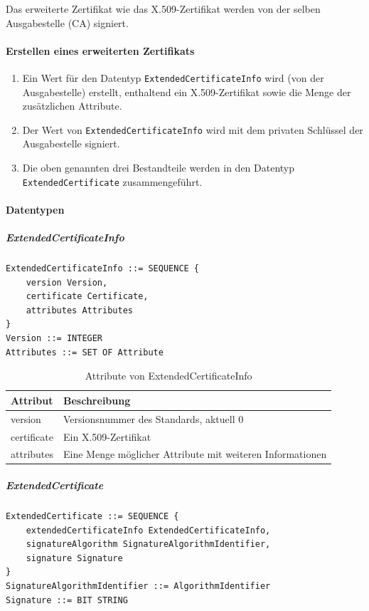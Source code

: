 \documentclass[10pt,a4paper]{article}
\begin{document}
Das erweiterte Zertifikat wie das X.509-Zertifikat werden von der selben Ausgabestelle
(CA) signiert.

\paragraph{Erstellen eines erweiterten Zertifikats}
\begin{enumerate}
    \item Ein Wert für den Datentyp \texttt{ExtendedCertificateInfo} wird (von der
        Ausgabestelle) erstellt, enthaltend ein X.509-Zertifikat sowie die Menge der
        zusätzlichen Attribute.
    \item Der Wert von \texttt{ExtendedCertificateInfo} wird mit dem privaten Schlüssel
        der Ausgabestelle signiert.
    \item Die oben genannten drei Bestandteile werden in den Datentyp
        \texttt{ExtendedCertificate} zusammengeführt.
\end{enumerate}

\paragraph{Datentypen}
\subparagraph{ExtendedCertificateInfo}
\begin{verbatim}
ExtendedCertificateInfo ::= SEQUENCE {
    version Version,
    certificate Certificate,
    attributes Attributes
}
Version ::= INTEGER
Attributes ::= SET OF Attribute
\end{verbatim}


\begin{table}[ht]
    \centering
    \begin{tabular}{|l|p{7.2cm}|} \hline
        \textbf{Attribut} & \textbf{Beschreibung} \\\hline
        version & Versionsnummer des Standards, aktuell 0 \\\hline
        certificate & Ein X.509-Zertifikat \\\hline
        attributes & Eine Menge möglicher Attribute mit weiteren Informationen \\\hline
    \end{tabular}
    \caption{Attribute von ExtendedCertificateInfo}
    \label{tab:ext-cert-info-attribs}
\end{table}


\subparagraph{ExtendedCertificate}
\begin{verbatim}
ExtendedCertificate ::= SEQUENCE {
    extendedCertificateInfo ExtendedCertificateInfo,
    signatureAlgorithm SignatureAlgorithmIdentifier,
    signature Signature
}
SignatureAlgorithmIdentifier ::= AlgorithmIdentifier
Signature ::= BIT STRING
\end{verbatim}
\end{document}
